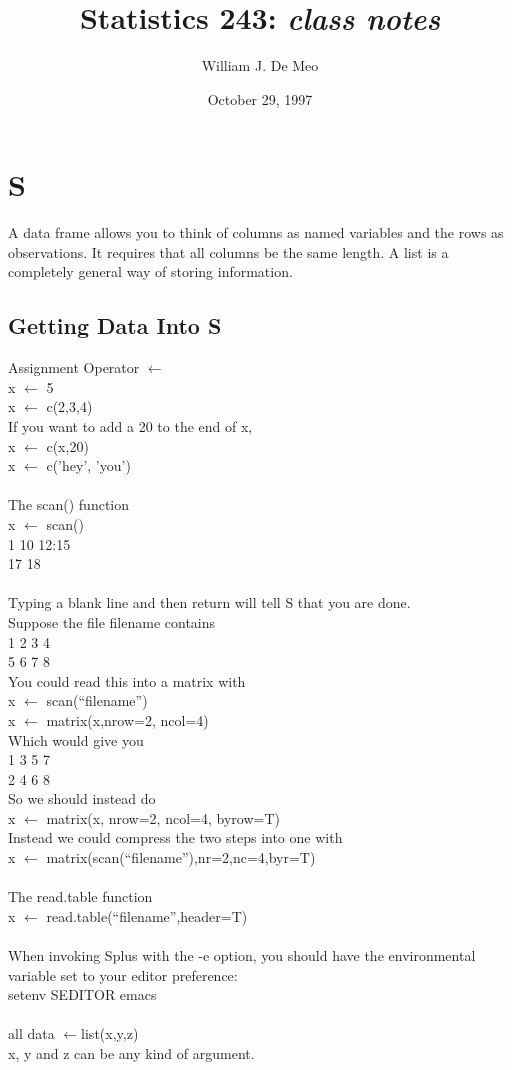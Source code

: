 \documentclass{article}
\begin{document}
\title{Statistics 243: \emph{class notes}}
\author{William J. De Meo}
\date{October 29, 1997 }
\maketitle
\section{S}
A data frame allows you to think of columns as named variables and the rows
as observations.  It requires that all columns be the same length.  A list
is a completely general way of storing information.
\subsection{Getting Data Into S}
Assignment Operator $\leftarrow$ \\
x $\leftarrow$ 5 \\
x $\leftarrow$ c(2,3,4)\\
If you want to add a 20 to the end of x,\\
x $\leftarrow$ c(x,20)\\
x $\leftarrow$ c('hey', 'you')\\\\
The scan() function\\
x $\leftarrow$ scan()\\
1 10 12:15\\
17 18\\
\\
Typing a blank line and then return will tell S that you are done.\\
Suppose the file filename contains \\
1 2 3 4 \\
5 6 7 8\\
You  could read this into a matrix with\\
x $\leftarrow$ scan(``filename'')\\
x $\leftarrow$ matrix(x,nrow=2, ncol=4)\\ 
Which would give you \\
1 3 5 7\\
2 4 6 8\\
So we should instead do\\
x $\leftarrow$ matrix(x, nrow=2, ncol=4, byrow=T)\\
Instead we could compress the two steps into one with\\
x $\leftarrow$ matrix(scan(``filename''),nr=2,nc=4,byr=T)\\\\
The read.table function\\
x $\leftarrow$ read.table(``filename'',header=T)\\\\
When invoking Splus with the -e option, you should have the environmental
variable set to your editor preference:\\
setenv SEDITOR emacs \\\\
all data $\leftarrow$list(x,y,z)\\
x, y and z can be any kind of argument.\\\\
\end{document}
